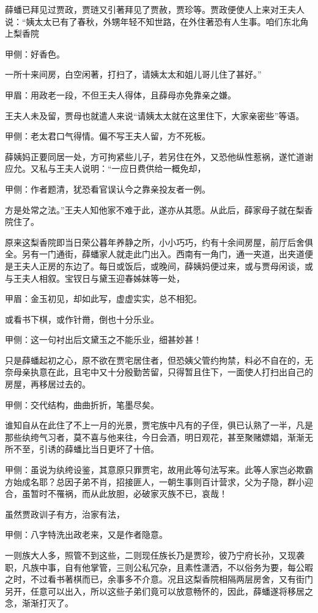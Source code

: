 \begin{parag}
    薛蟠已拜见过贾政，贾琏又引著拜见了贾赦，贾珍等。贾政便使人上来对王夫人说：“姨太太已有了春秋，外甥年轻不知世路，在外住著恐有人生事。咱们东北角上梨香院\begin{note}甲侧：好香色。\end{note}一所十来间房，白空闲著，打扫了，请姨太太和姐儿哥儿住了甚好。”\begin{note}甲眉：用政老一段，不但王夫人得体，且薛母亦免靠亲之嫌。\end{note}王夫人未及留，贾母也就遣人来说“请姨太太就在这里住下，大家亲密些”等语。\begin{note}甲侧：老太君口气得情。偏不写王夫人留，方不死板。\end{note}薛姨妈正要同居一处，方可拘紧些儿子，若另住在外，又恐他纵性惹祸，遂忙道谢应允。又私与王夫人说明：“一应日费供给一概免却，\begin{note}甲侧：作者题清，犹恐看官误认今之靠亲投友者一例。\end{note}方是处常之法。”王夫人知他家不难于此，遂亦从其愿。从此后，薛家母子就在梨香院住了。
\end{parag}


\begin{parag}
    原来这梨香院即当日荣公暮年养静之所，小小巧巧，约有十余间房屋，前厅后舍俱全。另有一门通街，薛蟠家人就走此门出入。西南有一角门，通一夹道，出夹道便是王夫人正房的东边了。每日或饭后，或晚间，薛姨妈便过来，或与贾母闲谈，或与王夫人相叙。宝钗日与黛玉迎春姊妹等一处，\begin{note}甲眉：金玉初见，却如此写，虚虚实实，总不相犯。\end{note}或看书下棋，或作针黹，倒也十分乐业。\begin{note}甲侧：这一句衬出后文黛玉之不能乐业，细甚妙甚！\end{note}只是薛蟠起初之心，原不欲在贾宅居住者，但恐姨父管约拘禁，料必不自在的，无奈母亲执意在此，且宅中又十分殷勤苦留，只得暂且住下，一面使人打扫出自己的房屋，再移居过去的。\begin{note}甲侧：交代结构，曲曲折折，笔墨尽矣。\end{note}谁知自从在此住了不上一月的光景，贾宅族中凡有的子侄，俱已认熟了一半，凡是那些纨绔气习者，莫不喜与他来往，今日会酒，明日观花，甚至聚赌嫖娼，渐渐无所不至，引诱的薛蟠比当日更坏了十倍。\begin{note}甲侧：虽说为纨绔设鉴，其意原只罪贾宅，故用此等句法写来。此等人家岂必欺霸方始成名耶？总因子弟不肖，招接匪人，一朝生事则百计营求，父为子隐，群小迎合，虽暂时不罹祸，而从此放胆，必破家灭族不已，哀哉！\end{note}虽然贾政训子有方，治家有法，\begin{note}甲侧：八字特洗出政老来，又是作者隐意。\end{note}一则族大人多，照管不到这些，二则现任族长乃是贾珍，彼乃宁府长孙，又现袭职，凡族中事，自有他掌管，三则公私冗杂，且素性潇洒，不以俗务为要，每公暇之时，不过看书著棋而已，余事多不介意。况且这梨香院相隔两层房舍，又有街门另开，任意可以出入，所以这些子弟们竟可以放意畅怀的，因此，薛蟠遂将移居之念，渐渐打灭了。
\end{parag}


